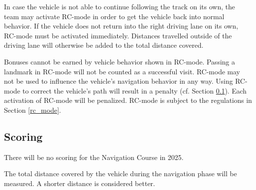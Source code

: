 \begin{highlight}[yellow]
    In case the vehicle is not able to continue following the track on its own, the
    team may activate RC-mode in order to get the vehicle back into normal
    behavior. If the vehicle does not return into the right driving lane on its
    own, RC-mode must be activated immediately. Distances travelled outside of the
    driving lane will otherwise be added to the total distance covered.

    Bonuses cannot be earned by vehicle behavior shown in RC-mode. Passing a
    landmark in RC-mode will not be counted as a successful visit. RC-mode may not
    be used to influence the vehicle's navigation behavior in any way. Using
    RC-mode to correct the vehicle's path will result in a penalty (cf. Section
    \ref{navigation_scoring}). Each activation of RC-mode will be penalized.
    RC-mode is subject to the regulations in Section \ref{rc_mode}.

    \subsection{Scoring}
    \label{navigation_scoring}

    There will be no scoring for the Navigation Course in 2025.

    The total distance covered by the vehicle during the navigation phase will be
    measured. A shorter distance is considered better.

\end{highlight}
